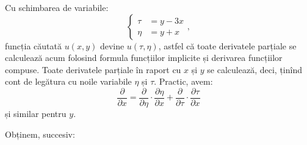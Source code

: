 Cu schimbarea de variabile:
\[
  \begin{cases}
    \tau &= y - 3x \\
    \eta &= y + x
  \end{cases},
\]
funcția căutată $ u(x, y) $ devine $ u(\tau, \eta) $, astfel că toate derivatele parțiale
se calculează acum folosind formula funcțiilor implicite și derivarea funcțiilor compuse.
Toate derivatele parțiale în raport cu $ x $ și $ y $ se calculează, deci, ținînd cont de legătura
cu noile variabile $ \eta $ și $ \tau $. Practic, avem:
\[
  \dfrac{\partial}{\partial x} = \dfrac{\partial}{\partial \eta} \cdot \dfrac{\partial \eta}{\partial x} + %
  \dfrac{\partial}{\partial \tau} \cdot \dfrac{\partial \tau}{\partial x}
\]
și similar pentru $ y $.

Obținem, succesiv:

